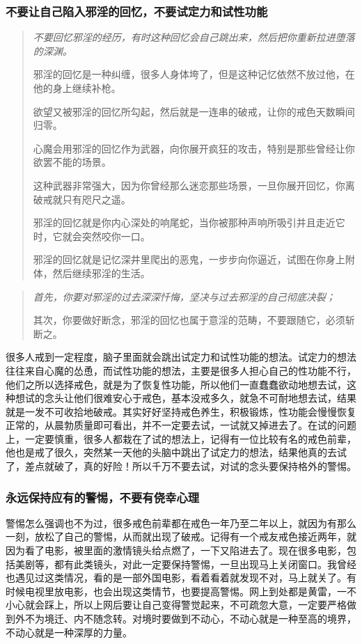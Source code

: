 \subsubsection{不要让自己陷入邪淫的回忆，不要试定力和试性功能}

\begin{quotation}\it
    不要回忆邪淫的经历，有时这种回忆会自己跳出来，然后把你重新拉进堕落的深渊。

    邪淫的回忆是一种纠缠，很多人身体垮了，但是这种记忆依然不放过他，在他的身上继续补枪。

    欲望又被邪淫的回忆所勾起，然后就是一连串的破戒，让你的戒色天数瞬间归零。

    心魔会用邪淫的回忆作为武器，向你展开疯狂的攻击，特别是那些曾经让你欲罢不能的场景。

    这种武器非常强大，因为你曾经那么迷恋那些场景，一旦你展开回忆，你离破戒就只有咫尺之遥。

    邪淫的回忆就是你内心深处的响尾蛇，当你被那种声响所吸引并且走近它时，它就会突然咬你一口。

    邪淫的回忆就是记忆深井里爬出的恶鬼，一步步向你逼近，试图在你身上附体，然后继续邪淫的生活。
\end{quotation}

\begin{quotation}\it
    首先，你要对邪淫的过去深深忏悔，坚决与过去邪淫的自己彻底决裂；

    其次，你要做好断念，邪淫的回忆也属于意淫的范畴，不要跟随它，必须斩断之。
\end{quotation}

很多人戒到一定程度，脑子里面就会跳出试定力和试性功能的想法。试定力的想法往往来自心魔的怂恿，而试性功能的想法，主要是很多人担心自己的性功能不行，他们之所以选择戒色，就是为了恢复性功能，所以他们一直蠢蠢欲动地想去试，这种想试的念头让他们很难安心于戒色，基本没戒多久，就急不可耐地想去试，结果就是一发不可收拾地破戒。其实好好坚持戒色养生，积极锻炼，性功能会慢慢恢复正常的，从晨勃质量即可看出，并不一定要去试，一试就又掉进去了。在试的问题上，一定要慎重，很多人都栽在了试的想法上，记得有一位比较有名的戒色前辈，他也是戒了很久，突然某一天他的头脑中跳出了试定力的想法，结果他真的去试了，差点就破了，真的好险！所以千万不要去试，对试的念头要保持格外的警惕。

\subsubsection{永远保持应有的警惕，不要有侥幸心理}

警惕怎么强调也不为过，很多戒色前辈都在戒色一年乃至二年以上，就因为有那么一刻，放松了自己的警惕，从而就出现了破戒。记得有一个戒友戒色接近两年，就因为看了电影，被里面的激情镜头给点燃了，一下又陷进去了。现在很多电影，包括美剧等，都有此类镜头，对此一定要保持警惕，一旦出现马上关闭窗口。我曾经也遇见过这类情况，看的是一部外国电影，看着看着就发现不对，马上就关了。有时候电视里放电影，也会出现这类情节，也要提高警惕。网上到处都是黄雷，一不小心就会踩上，所以上网后要让自己变得警觉起来，不可疏忽大意，一定要严格做到外不为境迁、内不随念转。对境时要做到不动心，不动心就是一种至高的境界，不动心就是一种深厚的力量。

